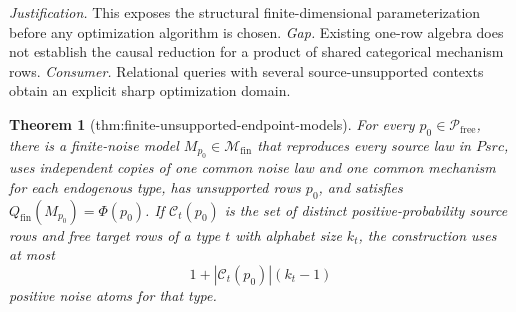 \documentclass{article}
\newtheorem{theorem}{Theorem}
\begin{document}
\par\smallskip\noindent \textit{Justification.} This exposes the structural finite-dimensional parameterization before any optimization algorithm is chosen. \textit{Gap.} Existing one-row algebra does not establish the causal reduction for a product of shared categorical mechanism rows. \textit{Consumer.} Relational queries with several source-unsupported contexts obtain an explicit sharp optimization domain.

\begin{theorem}[thm:finite-unsupported-endpoint-models]\label{thm:finite-unsupported-endpoint-models}
For every \(p_0\in\mathcal P_{\mathrm{free}}\), there is a finite-noise model \(M_{p_0}\in\mathcal M_{\mathrm{fin}}\) that reproduces every source law in \(Psrc\), uses independent copies of one common noise law and one common mechanism for each endogenous type, has unsupported rows \(p_0\), and satisfies \(Q_{\mathrm{fin}}(M_{p_0})=\Phi(p_0)\).  If \(\mathcal C_t(p_0)\) is the set of distinct positive-probability source rows and free target rows of a type \(t\) with alphabet size \(k_t\), the construction uses at most
\[
 1+|\mathcal C_t(p_0)|(k_t-1)
\]
positive noise atoms for that type.
\end{theorem}
\end{document}
